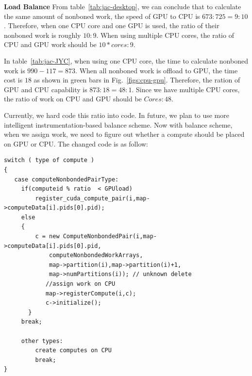 \textbf{Load Balance} From table~\ref{tab:jac-desktop}, we can conclude that 
to calculate the same amount of nonboned work, the speed of GPU to CPU is 
$673:725 = 9:10$. Therefore, when one CPU core and one GPU is used, 
    the ratio of their nonboned work is roughly $10:9$. When using multiple CPU cores,
    the ratio of CPU and GPU work should be  $10*cores : 9 $.

In table~\ref{tab:jac-JYC}, when using one CPU core, the time to calculate nonboned work 
is  $ 990-117 = 873$. When all nonboned work is offload to GPU, the time cost is 
$18$ as shown in green bars in Fig.~\ref{figs:cpu-gpu}. Therefore, the ration of GPU 
and CPU capability is $873:18 = 48:1$. Since we have multiple CPU cores, the ratio of work on CPU 
and GPU should be $ Cores: 48 $.

Currently, we hard code this ratio into code. In future, we plan to use more intelligent instrumentation-based
balance scheme. Now with balance scheme, when we assign work, we need to figure out 
whether a compute should be placed on GPU or CPU. The changed code is as follow:

\begin{lstlisting}[frame=single,caption={Balanced Compute Assignment},label=gpu-cpu-assignment-balance]
switch ( type of compute )    
{
   case computeNonbondedPairType:
     if(computeid % ratio  < GPUload)
         register_cuda_compute_pair(i,map->computeData[i].pids[0].pid);
     else
     {
         c = new ComputeNonbondedPair(i,map->computeData[i].pids[0].pid,
             computeNonbondedWorkArrays,
             map->partition(i),map->partition(i)+1,
             map->numPartitions(i)); // unknown delete
            //assign work on CPU
            map->registerCompute(i,c);
            c->initialize();
       }
     break;

     other types:
         create computes on CPU
         break;
}
\end{lstlisting}
